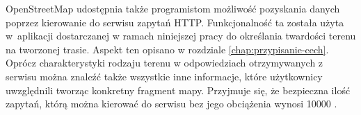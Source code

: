 OpenStreetMap udostępnia także programistom możliwość pozyskania danych poprzez kierowanie do serwisu zapytań HTTP. Funkcjonalność ta została użyta w~aplikacji dostarczanej w ramach niniejszej pracy do określania twardości terenu na tworzonej trasie. Aspekt ten opisano w rozdziale \ref{chap:przypisanie-cech}. Oprócz charakterystyki rodzaju terenu w odpowiedziach otrzymywanych z serwisu można znaleźć także wszystkie inne informacje, które użytkownicy uwzględnili tworząc konkretny fragment mapy. Przyjmuje się, że bezpieczna ilość zapytań, którą można kierować do serwisu bez jego obciążenia wynosi 10000 \cite{osm-docs-wiki}.